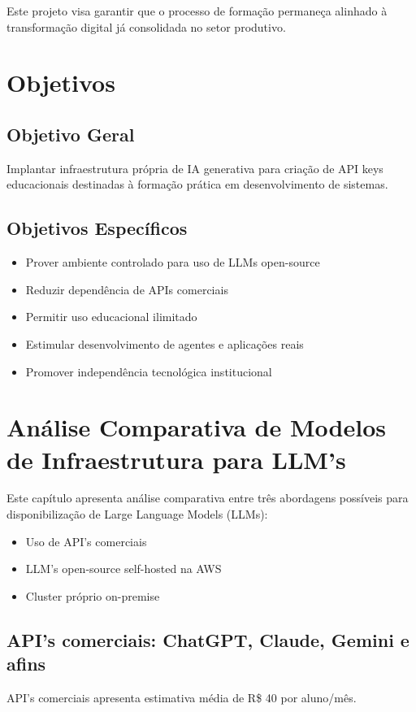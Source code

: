\documentclass[12pt,a4paper,]{abntex2}
\begin{document}
Este projeto visa garantir que o processo de formação permaneça alinhado à transformação digital já consolidada no setor produtivo.

\chapter{Objetivos}

\section{Objetivo Geral}

Implantar infraestrutura própria de IA generativa para criação de API keys educacionais destinadas à formação prática em desenvolvimento de sistemas.

\section{Objetivos Específicos}

\begin{itemize}
\item Prover ambiente controlado para uso de LLMs open-source
\item Reduzir dependência de APIs comerciais
\item Permitir uso educacional ilimitado
\item Estimular desenvolvimento de agentes e aplicações reais
\item Promover independência tecnológica institucional
\end{itemize}

\chapter{Análise Comparativa de Modelos de Infraestrutura para LLM's}

Este capítulo apresenta análise comparativa entre três abordagens possíveis para disponibilização de Large Language Models (LLMs):

\begin{itemize}
\item Uso de API's comerciais
\item LLM's open-source self-hosted na AWS
\item Cluster próprio on-premise
\end{itemize}

\section{API's comerciais: ChatGPT, Claude, Gemini e afins}
API's comerciais apresenta estimativa média de R\$ 40 por aluno/mês.
\end{document}
